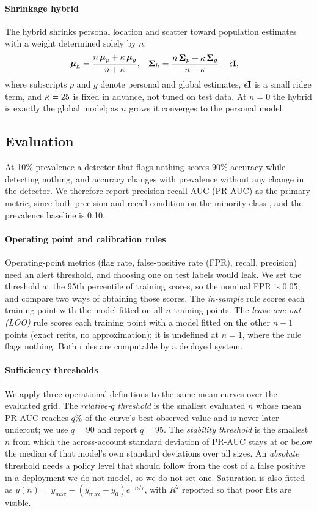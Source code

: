 \paragraph{Shrinkage hybrid}
The hybrid shrinks personal location and scatter toward population estimates with a weight determined solely by $n$:
\begin{align}
\boldsymbol{\mu}_{h} &= \frac{n\,\boldsymbol{\mu}_{p}+\kappa\,\boldsymbol{\mu}_{g}}{n+\kappa}, &
\boldsymbol{\Sigma}_{h} &= \frac{n\,\boldsymbol{\Sigma}_{p}+\kappa\,\boldsymbol{\Sigma}_{g}}{n+\kappa}+\epsilon\mathbf{I},
\end{align}
where subscripts $p$ and $g$ denote personal and global estimates, $\epsilon\mathbf{I}$ is a small ridge term, and $\kappa=25$ is fixed in advance, not tuned on test data. At $n=0$ the hybrid is exactly the global model; as $n$ grows it converges to the personal model.

\subsection{Evaluation}
At 10\% prevalence a detector that flags nothing scores 90\% accuracy while detecting nothing, and accuracy changes with prevalence without any change in the detector. We therefore report precision-recall AUC (PR-AUC) as the primary metric, since both precision and recall condition on the minority class \cite{saito2015precision}, and the prevalence baseline is 0.10.

\paragraph{Operating point and calibration rules}
Operating-point metrics (flag rate, false-positive rate (FPR), recall, precision) need an alert threshold, and choosing one on test labels would leak. We set the threshold at the 95th percentile of training scores, so the nominal FPR is 0.05, and compare two ways of obtaining those scores. The \emph{in-sample} rule scores each training point with the model fitted on all $n$ training points. The \emph{leave-one-out (LOO)} rule scores each training point with a model fitted on the other $n-1$ points (exact refits, no approximation); it is undefined at $n=1$, where the rule flags nothing. Both rules are computable by a deployed system.

\paragraph{Sufficiency thresholds}
We apply three operational definitions to the same mean curves over the evaluated grid. The \emph{relative-$q$ threshold} is the smallest evaluated $n$ whose mean PR-AUC reaches $q\%$ of the curve's best observed value and is never later undercut; we use $q=90$ and report $q=95$. The \emph{stability threshold} is the smallest $n$ from which the across-account standard deviation of PR-AUC stays at or below the median of that model's own standard deviations over all sizes. An \emph{absolute} threshold needs a policy level that should follow from the cost of a false positive in a deployment we do not model, so we do not set one. Saturation is also fitted as $y(n)=y_{\max}-(y_{\max}-y_0)e^{-n/\tau}$, with $R^2$ reported so that poor fits are visible.

